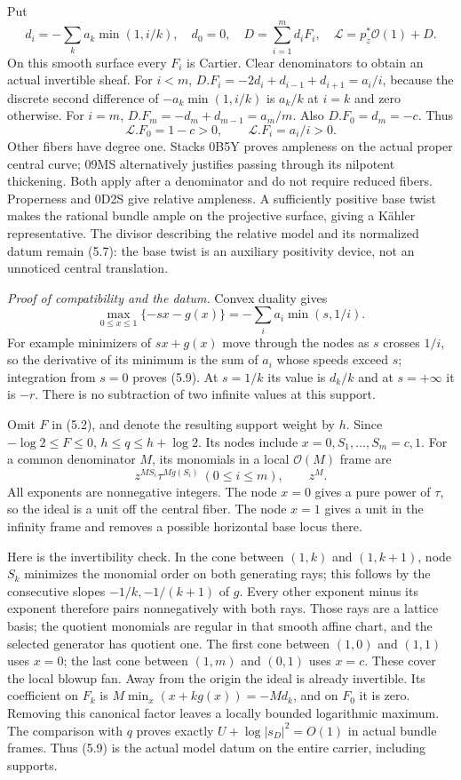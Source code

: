 \documentclass[
  11pt,
]{article}
\begin{document}
Put \[
 d_i=-\sum_k a_k\min(1,i/k),\quad d_0=0,\quad
 D=\sum_{i=1}^m d_iF_i,\quad \mathcal L=p_z^*\mathcal O(1)+D.
 \tag{5.7}
\] On this smooth surface every \(F_i\) is Cartier. Clear denominators
to obtain an actual invertible sheaf. For \(i<m\),
\(D.F_i=-2d_i+d_{i-1}+d_{i+1}=a_i/i\), because the discrete second
difference of \(-a_k\min(1,i/k)\) is \(a_k/k\) at \(i=k\) and zero
otherwise. For \(i=m\), \(D.F_m=-d_m+d_{m-1}=a_m/m\). Also
\(D.F_0=d_m=-c\). Thus
\[ \mathcal L.F_0=1-c>0,\qquad \mathcal L.F_i=a_i/i>0. \tag{5.8}\] Other
fibers have degree one. Stacks 0B5Y proves ampleness on the actual
proper central curve; 09MS alternatively justifies passing through its
nilpotent thickening. Both apply after a denominator and do not require
reduced fibers. Properness and 0D2S give relative ampleness. A
sufficiently positive base twist makes the rational bundle ample on the
projective surface, giving a Kähler representative. The divisor
describing the relative model and its normalized datum remain (5.7): the
base twist is an auxiliary positivity device, not an unnoticed central
translation.

\emph{Proof of compatibility and the datum.} Convex duality gives
\[ \max_{0\leq x\leq1}\{-sx-g(x)\}
                  =-\sum_i a_i\min(s,1/i). \tag{5.9}\] For example
minimizers of \(sx+g(x)\) move through the nodes as \(s\) crosses
\(1/i\), so the derivative of its minimum is the sum of \(a_i\) whose
speeds exceed \(s\); integration from \(s=0\) proves (5.9). At \(s=1/k\)
its value is \(d_k/k\) and at \(s=+\infty\) it is \(-r\). There is no
subtraction of two infinite values at this support.

Omit \(F\) in (5.2), and denote the resulting support weight by \(h\).
Since \(-\log2\leq F\leq0\), \(h\leq q\leq h+\log2\). Its nodes include
\(x=0,S_1,\ldots,S_m=c,1\). For a common denominator \(M\), its
monomials in a local \(\mathcal O(M)\) frame are
\[ z^{MS_i}\tau^{Mg(S_i)}\ (0\leq i\leq m),\qquad z^M. \tag{5.10}\] All
exponents are nonnegative integers. The node \(x=0\) gives a pure power
of \(\tau\), so the ideal is a unit off the central fiber. The node
\(x=1\) gives a unit in the infinity frame and removes a possible
horizontal base locus there.

Here is the invertibility check. In the cone between \((1,k)\) and
\((1,k+1)\), node \(S_k\) minimizes the monomial order on both
generating rays; this follows by the consecutive slopes
\(-1/k,-1/(k+1)\) of \(g\). Every other exponent minus its exponent
therefore pairs nonnegatively with both rays. Those rays are a lattice
basis; the quotient monomials are regular in that smooth affine chart,
and the selected generator has quotient one. The first cone between
\((1,0)\) and \((1,1)\) uses \(x=0\); the last cone between \((1,m)\)
and \((0,1)\) uses \(x=c\). These cover the local blowup fan. Away from
the origin the ideal is already invertible. Its coefficient on \(F_k\)
is \(M\min_x(x+kg(x))=-Md_k\), and on \(F_0\) it is zero. Removing this
canonical factor leaves a locally bounded logarithmic maximum. The
comparison with \(q\) proves exactly \(U+\log|s_D|^2=O(1)\) in actual
bundle frames. Thus (5.9) is the actual model datum on the entire
carrier, including supports.
\end{document}
